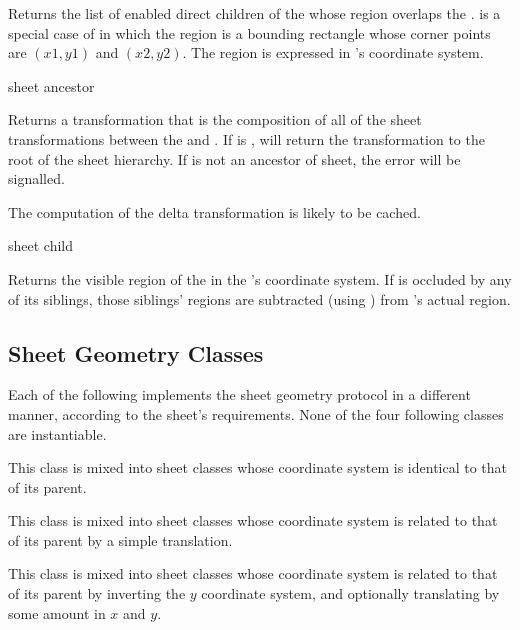 Returns the list of enabled direct children of the  
whose region overlaps the  .
 is a special case of
 in which the region is a bounding rectangle
whose corner points are $(x1,y1)$ and $(x2,y2)$.  The region is expressed in
's coordinate system.
\FreshOutputs


 {sheet ancestor}

Returns a transformation that is the composition of all of the sheet
transformations between the   and .  If
 is ,  will return the
transformation to the root of the sheet hierarchy.  If  is not an
ancestor of sheet, the  error will be signalled.

The computation of the delta transformation is likely to be cached.

 {sheet child}

Returns the visible region of the   in the 
's coordinate system.  If  is occluded by any of its
siblings, those siblings' regions are subtracted (using )
from 's actual region.


\subsection {Sheet Geometry Classes}

Each of the following implements the sheet geometry protocol in a different
manner, according to the sheet's requirements.  None of the four following
classes are instantiable.


This class is mixed into sheet classes whose coordinate system is identical to
that of its parent.


This class is mixed into sheet classes whose coordinate system is related to
that of its parent by a simple translation.


This class is mixed into sheet classes whose coordinate system is related to
that of its parent by inverting the $y$ coordinate system, and optionally
translating by some amount in $x$ and $y$.

